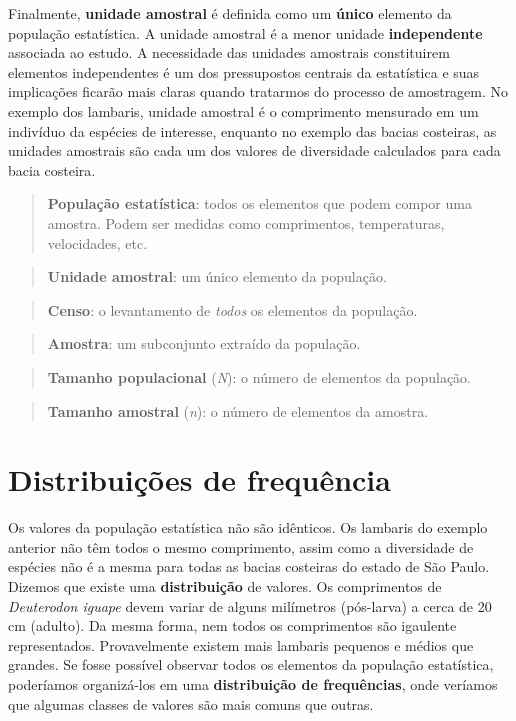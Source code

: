 \documentclass[
]{book}
\begin{document}
Finalmente, \textbf{unidade amostral} é definida como um \textbf{único} elemento da população estatística. A unidade amostral é a menor unidade \textbf{independente} associada ao estudo. A necessidade das unidades amostrais constituirem elementos independentes é um dos pressupostos centrais da estatística e suas implicações ficarão mais claras quando tratarmos do processo de amostragem. No exemplo dos lambaris, unidade amostral é o comprimento mensurado em um indivíduo da espécies de interesse, enquanto no exemplo das bacias costeiras, as unidades amostrais são cada um dos valores de diversidade calculados para cada bacia costeira.

\begin{quote}
\textbf{População estatística}: todos os elementos que podem compor uma amostra. Podem ser medidas como comprimentos, temperaturas, velocidades, etc.
\end{quote}

\begin{quote}
\textbf{Unidade amostral}: um único elemento da população.
\end{quote}

\begin{quote}
\textbf{Censo}: o levantamento de \emph{todos} os elementos da população.
\end{quote}

\begin{quote}
\textbf{Amostra}: um subconjunto extraído da população.
\end{quote}

\begin{quote}
\textbf{Tamanho populacional} (\emph{N}): o número de elementos da população.
\end{quote}

\begin{quote}
\textbf{Tamanho amostral} (\emph{n}): o número de elementos da amostra.
\end{quote}

\hypertarget{distribuiuxe7uxf5es-de-frequuxeancia}{%
\section{Distribuições de frequência}\label{distribuiuxe7uxf5es-de-frequuxeancia}}

Os valores da população estatística não são idênticos. Os lambaris do exemplo anterior não têm todos o mesmo comprimento, assim como a diversidade de espécies não é a mesma para todas as bacias costeiras do estado de São Paulo. Dizemos que existe uma \textbf{distribuição} de valores. Os comprimentos de \emph{Deuterodon iguape} devem variar de alguns milímetros (pós-larva) a cerca de 20 cm (adulto). Da mesma forma, nem todos os comprimentos são igaulente representados. Provavelmente existem mais lambaris pequenos e médios que grandes. Se fosse possível observar todos os elementos da população estatística, poderíamos organizá-los em uma \textbf{distribuição de frequências}, onde veríamos que algumas classes de valores são mais comuns que outras.
\end{document}
